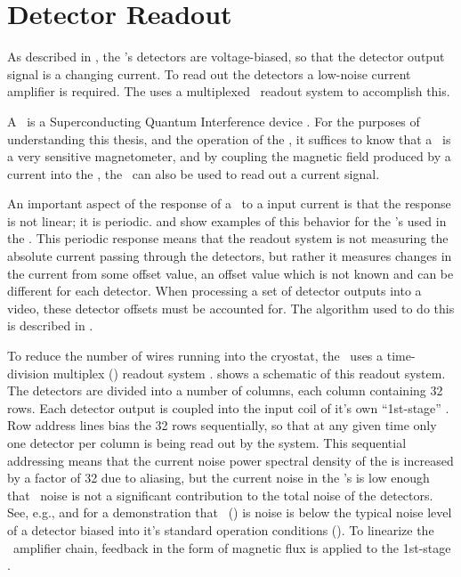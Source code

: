 \section{Detector Readout} \label{sec:det-readout}

As described in , the \Imager's detectors are voltage-biased, so that the detector output signal is a changing current.
To read out the detectors a low-noise current amplifier is required.
The \Imager uses a multiplexed \SQUID\ readout system to accomplish this.

A \SQUID\ is a Superconducting Quantum Interference device \cite{clarke_squid_2002}.
For the purposes of understanding this thesis, and the operation of the \Imager, it suffices to know that a \SQUID\ is a very sensitive magnetometer, and by coupling the magnetic field produced by a current into the \SQUID, the \SQUID\ can also be used to read out a current signal.

An important aspect of the response of a \SQUID\ to a input current is that the response is not linear; it is periodic.
 and  show examples of this behavior for the \SQUID's used in the \Imager.
This periodic response means that the readout system is not measuring the absolute current passing through the detectors, but rather it measures changes in the current from some offset value, an offset value which is not known and can be different for each detector.
When processing a set of detector outputs into a video, these detector offsets must be accounted for.
The algorithm used to do this is described in .

To reduce the number of wires running into the cryostat, the \Imager\ uses a time-division multiplex (\TDM) readout system \cite{chervenak_superconducting_1999,korte_time-division_2003,reintsema_prototype_2003}.
 shows a schematic of this readout system.
The detectors are divided into a number of columns, each column containing 32 rows.
Each detector output is coupled into the input coil of it's own ``1st-stage'' \SQUID.
Row address lines bias the 32 rows sequentially, so that at any given time only one detector per column is being read out by the system.
This sequential addressing means that the current noise power spectral density of the \SQUIDs is increased by a factor of 32 due to aliasing, but the current noise in the \Imager's \SQUIDs is low enough that \SQUID\ noise is not a significant contribution to the total noise of the detectors.
See, e.g.,  and  for a demonstration that \SQUID\ () is noise is below the typical noise level of a detector biased into it's standard operation conditions ().
To linearize the \SQUID\ amplifier chain, feedback in the form of magnetic flux is applied to the 1st-stage \SQUIDs.

